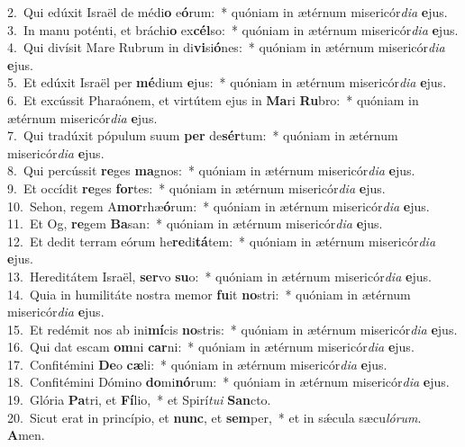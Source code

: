 {2.~}Qui edúxit Israël de médi\textbf{o} e\textbf{ó}rum:~* quóniam in ætérnum misericór\textit{di}\textit{a} \textbf{e}jus.\\
{3.~}In manu poténti, et bráchi\textbf{o} ex\textbf{cél}so:~* quóniam in ætérnum misericór\textit{di}\textit{a} \textbf{e}jus.\\
{4.~}Qui divísit Mare Rubrum in di\textbf{vi}si\textbf{ó}nes:~* quóniam in ætérnum misericór\textit{di}\textit{a} \textbf{e}jus.\\
{5.~}Et edúxit Israël per \textbf{mé}dium \textbf{e}jus:~* quóniam in ætérnum misericór\textit{di}\textit{a} \textbf{e}jus.\\
{6.~}Et excússit Pharaónem, et virtútem ejus in \textbf{Ma}ri \textbf{Ru}bro:~* quóniam in ætérnum misericór\textit{di}\textit{a} \textbf{e}jus.\\
{7.~}Qui tradúxit pópulum suum \textbf{per} de\textbf{sér}tum:~* quóniam in ætérnum misericór\textit{di}\textit{a} \textbf{e}jus.\\
{8.~}Qui percússit \textbf{re}ges \textbf{ma}gnos:~* quóniam in ætérnum misericór\textit{di}\textit{a} \textbf{e}jus.\\
{9.~}Et occídit \textbf{re}ges \textbf{for}tes:~* quóniam in ætérnum misericór\textit{di}\textit{a} \textbf{e}jus.\\
{10.~}Sehon, regem A\textbf{mor}rhæ\textbf{ó}rum:~* quóniam in ætérnum misericór\textit{di}\textit{a} \textbf{e}jus.\\
{11.~}Et Og, \textbf{re}gem \textbf{Ba}san:~* quóniam in ætérnum misericór\textit{di}\textit{a} \textbf{e}jus.\\
{12.~}Et dedit terram eórum he\textbf{re}di\textbf{tá}tem:~* quóniam in ætérnum misericór\textit{di}\textit{a} \textbf{e}jus.\\
{13.~}Hereditátem Israël, \textbf{ser}vo \textbf{su}o:~* quóniam in ætérnum misericór\textit{di}\textit{a} \textbf{e}jus.\\
{14.~}Quia in humilitáte nostra memor \textbf{fu}it \textbf{no}stri:~* quóniam in ætérnum misericór\textit{di}\textit{a} \textbf{e}jus.\\
{15.~}Et redémit nos ab ini\textbf{mí}cis \textbf{no}stris:~* quóniam in ætérnum misericór\textit{di}\textit{a} \textbf{e}jus.\\
{16.~}Qui dat escam \textbf{om}ni \textbf{car}ni:~* quóniam in ætérnum misericór\textit{di}\textit{a} \textbf{e}jus.\\
{17.~}Confitémini \textbf{De}o \textbf{cæ}li:~* quóniam in ætérnum misericór\textit{di}\textit{a} \textbf{e}jus.\\
{18.~}Confitémini Dómino \textbf{do}mi\textbf{nó}rum:~* quóniam in ætérnum misericór\textit{di}\textit{a} \textbf{e}jus.\\
{19.~}Glória \textbf{Pa}tri, et \textbf{Fí}lio,~* et Spirí\textit{tu}\textit{i} \textbf{San}cto.\\
{20.~}Sicut erat in princípio, et \textbf{nunc}, et \textbf{sem}per,~* et in sǽcula sæcu\textit{ló}\textit{rum}. \textbf{A}men.\\
